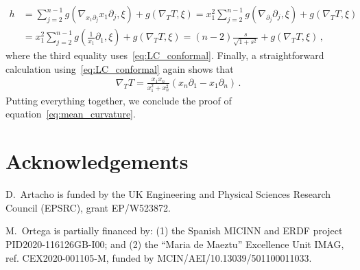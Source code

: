 \documentclass[oneside,12pt]{amsart}
\theoremstyle{definition}
\begin{document}
\begin{align*}
h &= \sum_{j=2}^{n-1} g \left( \nabla_{x_1 \partial_j} x_1 \partial_j , \xi  \right) + g\left( \nabla_{T} T , \xi \right) = x_1^2 \sum_{j=2}^{n-1} g \left( \nabla_{\partial_j} \partial_j , \xi  \right) + g\left( \nabla_{T} T , \xi \right) \\
&= x_1^2 \sum_{j=2}^{n-1} g \left( \frac{1}{x_1} \partial_1 , \xi  \right) + g\left( \nabla_{T} T , \xi \right) = (n-2) \frac{s}{\sqrt{1+s^2}} +  g\left( \nabla_{T} T , \xi \right) \, , 
\end{align*}
where the third equality uses~\eqref{eq:LC_conformal}. Finally, a straightforward calculation using~\eqref{eq:LC_conformal} again shows that  
\begin{align*}
\nabla_T T = \frac{x_1 x_n}{x_1^2 + x_n^2} \left( x_n \partial_1 -  x_1 \partial_n \right) \, . 
\end{align*}
Putting everything together, we conclude the proof of equation~\eqref{eq:mean_curvature}. 

\section*{Acknowledgements}

D.~Artacho is funded by the UK Engineering and Physical Sciences Research Council (EPSRC), grant EP/W523872.

M.~Ortega is partially financed by: (1) the Spanish MICINN and ERDF project PID2020-116126GB-I00; and (2) the “Maria de Maeztu” Excellence Unit IMAG, ref. CEX2020-001105-M, funded by MCIN/AEI/10.13039/501100011033.



\end{document}
